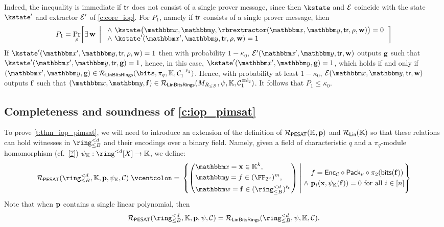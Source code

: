 \documentclass[11pt,letterpaper,usenames,dvipsnames]{article}
\begin{document}
Indeed, the inequality is immediate if $\mathsf{tr}$ does not consist of a single prover message, since then $\kstate$ and $\mathcal{E}$ coincide with the state $\kstate'$ and extractor $\mathcal{E}'$ of \cref{c:core_iop}. For $P_1$, namely if $\mathsf{tr}$ consists of a single prover message, then 
%
$$
P_1 = \Pr_{\rho}\!\left[
  \exists\,\ww \ \left| \ \begin{array}{l}
  \wedge\ \kstate\bigl(\inp,\oracle,\rbrextractor(\inp,\oracle,\tr, \rho,\ww)\bigr)=0\\
  \wedge\ \kstate'(\inp',\oracle,\tr, \rho, \ww)=1
  \end{array}
  \right.\right]
$$
If $\kstate'(\inp',\oracle,\tr, \rho, \ww)=1$ then with probability $1-\kappa_0$, $\cE'(\inp',\oracle, \tr, \ww)$ outputs $\mathbf{g}$ such that $\kstate'(\inp',\oracle, \tr, \bfg)=1$, hence, in this case, $\kstate'(\inp',\oracle, \bfg)=1$, which holds if and only if $(\inp',\oracle,\bfg)\in \LinBitsDual(\bits,\pi_q, \KK,\cC_1^{\equiv \codedim_2})$. Hence, with probability at least $1-\kappa_0$, $\cE(\inp,\oracle,\tr,\ww)$ outputs $\mathbf{f}$ such that $(\inp,\oracle,\bff)\in \LinModFieldBin(M_{R_{\leq B}},\modulemorphism, \KK, \cC_1^{\equiv \codedim_2})$. It follows that $P_1\leq \kappa_0$.

\subsection{Completeness and soundness of \cref{c:iop_pimsat}}\label{a:iop_pimsat}



To prove \cref{t:thm_iop_pimsat}, we will need to introduce an extension of the definition of $\mathcal{R}_{\mathsf{PESAT}}(\mathbb{K}, \mathbf{p})$ and $\mathcal{R}_{\mathsf{Lin}}(\mathbb{K})$ so that these relations can hold witnesses in $\ringtwobounds{B}{\moduledegree}$ and their encodings over a binary field. Namely, given a field of characteristic $q$ and a $\pi_q$-module homomorphism (cf.\ \cref{?}) $\psi_\KK:\ringdegbound{\moduledegree}[X]\to \KK$, we define:
$$
\PESAT(\ringtwobounds{B}{\moduledegree}, \KK, \pp,\psi_\KK, \cC) \defeq \left\{ \left(\begin{aligned} &\inp=\xx\in \KK^\inplen, \\&\oracle = f \in (\comfield)^{\codelength}, \\ &\wit= \bff\in (\ringtwobounds{B}{\moduledegree})^{\codedim_0}\end{aligned}\right) \;\middle|\;  \begin{aligned} 
&f=\Enc_{\cC}\circ \pack \circ \pi_2(\mathsf{bits}(\bff)) \\ \wedge \  &\pp_i(\xx, \psi_\KK(\bff)) = 0  \text{ for all } i\in [\numrows]\end{aligned}\right\}
$$
Note that when $\mathbf{p}$ contains a single linear polynomial, then
%
$$
\PESAT(\ringtwobounds{B}{\moduledegree}, \KK, \pp, \modulemorphism, \cC) = \LinModFieldBin(\ringtwobounds{B}{\moduledegree},\modulemorphism, \KK, \cC).
$$
%
\end{document}
